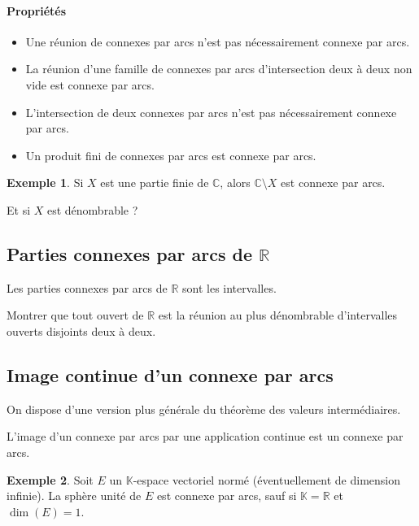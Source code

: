 \documentclass[french]{article}
\newcommand{\R}{\mathbb{R}}
\newcommand{\C}{\mathbb{C}}
\newcommand{\K}{\mathbb{K}}
\theoremstyle{plain}
\theoremstyle{definition}
\newtheorem*{ex}{Exemple}
\theoremstyle{remark}
\begin{document}
\paragraph{Propriétés}
\begin{itemize}
	\item Une réunion de connexes par arcs n'est pas nécessairement connexe par arcs.
	\item La réunion d'une famille de connexes par arcs d'intersection deux à deux non vide est connexe par arcs.
	\item L'intersection de deux connexes par arcs n'est pas nécessairement connexe par arcs.
	\item Un produit fini de connexes par arcs est connexe par arcs. 
\end{itemize}

\begin{ex}
	Si $X$ est une partie finie de $\C$, alors $\C\setminus X$ est connexe par arcs.
\end{ex}

\begin{exo}
	Et si $X$ est dénombrable ?
\end{exo}

\subsection{Parties connexes par arcs de $\R$}

\begin{prop}%
	Les parties connexes par arcs de $\R$ sont les intervalles.
\end{prop}

\begin{exo}
	Montrer que tout ouvert de $\R$ est la réunion au plus dénombrable d'intervalles ouverts disjoints deux à deux.
\end{exo}

\subsection{Image continue d'un connexe par arcs}

On dispose d'une version plus générale du théorème des valeurs intermédiaires.

\begin{thm}
	L'image d'un connexe par arcs par une application continue est un connexe par arcs.
\end{thm}

\begin{ex}
	Soit $E$ un $\K$-espace vectoriel normé (éventuellement de dimension infinie). La sphère unité de $E$ est connexe par arcs, sauf si $\K=\R$ et $\dim(E)=1$.
\end{ex}
\end{document}
